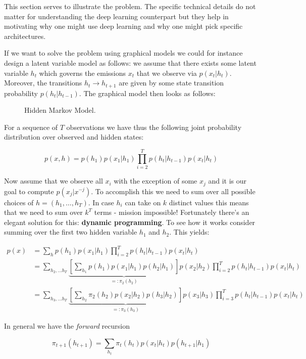 This section serves to illustrate the problem. The specific technical details do not matter for understanding the deep learning counterpart but they help in motivating why one might use deep learning and why one might pick specific architectures.

If we want to solve the problem using graphical models we could for instance design a latent variable model as follows: we assume that there exists some latent variable $h_t$ which governs the emissions $x_t$ that we observe via $p(x_t|h_t)$. Moreover, the transitions $h_t \to h_{t+1}$ are given by some state transition probability $p(h_t|h_{t-1})$. The graphical model then looks as follows:

\begin{figure}[hpt]
	\centering
	
	\caption{Hidden Markov Model.}
	\label{fig:hmm}
\end{figure}

For a sequence of $T$ observations we have thus the following joint probability distribution over observed and hidden states:

$$p(x,h) = p(h_1) p(x_1|h_1) \prod_{i=2}^T p(h_t|h_{t-1}) p(x_t|h_t)$$

Now assume that we observe all $x_i$ with the exception of some $x_j$ and it is our goal to compute $p(x_j|x^{-j})$. To accomplish this we need to sum over all possible choices of $h = (h_1, \ldots, h_T)$. In case $h_i$ can take on $k$ distinct values this means that we need to sum over $k^T$ terms - mission impossible! Fortunately there's an elegant solution for this: \textbf{dynamic programming}. To see how it works consider summing over the first two hidden variable $h_1$ and $h_2$. This yields:

$$\begin{aligned}
    p(x) & = \sum_h p(h_1) p(x_1|h_1) \prod_{i=2}^T p(h_t|h_{t-1}) p(x_t|h_t) \\
    & = \sum_{h_2, \ldots h_T} \underbrace{\left[\sum_{h_1} p(h_1) p(x_1|h_1) p(h_2|h_1)\right]}_{=: \pi_2(h_2)}
    p(x_2|h_2) \prod_{i=2}^T p(h_t|h_{t-1}) p(x_t|h_t) \\
    & = \sum_{h_3, \ldots h_T} \underbrace{\left[\sum_{h_2} \pi_2(h_2) p(x_2|h_2) p(h_3|h_2)\right]}_{=: \pi_3(h_3)}
    p(x_3|h_3) \prod_{i=3}^T p(h_t|h_{t-1}) p(x_t|h_t)
\end{aligned}$$

In general we have the \textit{forward} recursion

$$\pi_{t+1}(h_{t+1}) = \sum_{h_t} \pi_t(h_t) p(x_t|h_t) p(h_{t+1}|h_1)$$

